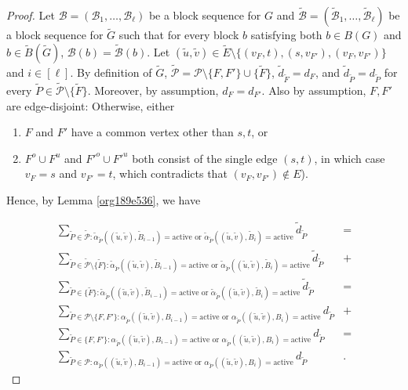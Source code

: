 \documentclass[fontsize=11pt,paper=a4]{book}
\begin{document}
\begin{proof}
Let \(\mathcal{B}=(\mathscr{B}_1,\dots,\mathscr{B}_{\ell})\) be a block sequence for \(G\) and \(\tilde{\mathcal{B}}=(\tilde{\mathscr{B}}_1,\dots,\tilde{\mathscr{B}}_{\ell})\) be a block sequence for \(\tilde{G}\) such that for every block \(b\) satisfying both \(b\in B(G)\) and \(b\in\tilde{B}(\tilde{G})\), \(\mathcal{B}(b)=\tilde{\mathcal{B}}(b)\).
Let \((\tilde{u},\tilde{v})\in\tilde{E}\setminus\{(v_F,t),(s,v_{F'}),(v_F,v_{F'})\}\) and \(i\in[\ell]\).
By definition of \(\tilde{G}\), \(\tilde{\mathcal{P}}=\mathcal{P}\setminus\{F,F'\}\cup\{\tilde{F}\}\), \(\tilde{d}_{\tilde{F}}=d_F\), and \(\tilde{d}_{\tilde{P}}=d_{\tilde{P}}\) for every \(\tilde{P}\in\tilde{\mathcal{P}}\setminus\{\tilde{F}\}\).
Moreover, by assumption, \(d_F=d_{F'}\).
Also by assumption, \(F,F'\) are edge-disjoint: Otherwise, either

\begin{enumerate}
\item \(F\) and \(F'\) have a common vertex other than \(s,t\), or

\item \(F^o\cup F^u\) and \(F'^o\cup F'^u\) both consist of the single edge \((s,t)\), in which case \(v_F=s\) and \(v_{F'}=t\), which contradicts that \((v_F,v_{F'})\notin E\)).
\end{enumerate}


Hence, by Lemma \ref{org189e536}, we have

\begin{align*}
\sum_{\tilde{P}\in\tilde{\mathcal{P}}:\tilde{\alpha}_{\tilde{P}}((\tilde{u},\tilde{v}),\tilde{B}_{i-1})=\mathrm{active}\text{ or }\tilde{\alpha}_{\tilde{P}}((\tilde{u},\tilde{v}),\tilde{B}_i)=\mathrm{active}}\tilde{d}_{\tilde{P}}&=\\
\sum_{\tilde{P}\in\tilde{\mathcal{P}}\setminus\{\tilde{F}\}:\tilde{\alpha}_{\tilde{P}}((\tilde{u},\tilde{v}),\tilde{B}_{i-1})=\mathrm{active}\text{ or }\tilde{\alpha}_{\tilde{P}}((\tilde{u},\tilde{v}),\tilde{B}_i)=\mathrm{active}}\tilde{d}_{\tilde{P}}&+\\
\sum_{\tilde{P}\in\{\tilde{F}\}:\tilde{\alpha}_{\tilde{P}}((\tilde{u},\tilde{v}),\tilde{B}_{i-1})=\mathrm{active}\text{ or }\tilde{\alpha}_{\tilde{P}}((\tilde{u},\tilde{v}),\tilde{B}_i)=\mathrm{active}}\tilde{d}_{\tilde{P}}&=\\
\sum_{\tilde{P}\in\mathcal{P}\setminus\{F,F'\}:\alpha_{\tilde{P}}((\tilde{u},\tilde{v}),B_{i-1})=\mathrm{active}\text{ or }\alpha_{\tilde{P}}((\tilde{u},\tilde{v}),B_i)=\mathrm{active}}d_{\tilde{P}}&+\\
\sum_{\tilde{P}\in\{F,F'\}:\alpha_{\tilde{P}}((\tilde{u},\tilde{v}),B_{i-1})=\mathrm{active}\text{ or }\alpha_{\tilde{P}}((\tilde{u},\tilde{v}),B_i)=\mathrm{active}}d_{\tilde{P}}&=\\
\sum_{\tilde{P}\in\mathcal{P}:\alpha_{\tilde{P}}((\tilde{u},\tilde{v}),B_{i-1})=\mathrm{active}\text{ or }\alpha_{\tilde{P}}((\tilde{u},\tilde{v}),B_i)=\mathrm{active}}d_{\tilde{P}}&.
\end{align*}
\end{proof}
\end{document}
